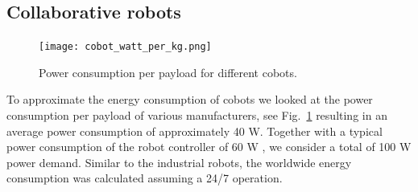 \subsection{Collaborative robots}\label{sec:app_cobot_ener_consumption}
\begin{figure}[!h]
	\centering
	\texttt{[image: cobot\_watt\_per\_kg.png]}
	\caption{Power consumption per payload for different cobots.}
	\label{fig:cobot_watt_per_kg}
\end{figure}
To approximate the energy consumption of cobots we looked at the power consumption per payload of various manufacturers, see Fig.~\ref{fig:cobot_watt_per_kg} resulting in an average power consumption of approximately 40 W. Together with a typical power consumption of the robot controller of 60 W \cite{Heredia2023BreakingEnergyConsumption}, we consider a total of 100 W power demand. Similar to the industrial robots, the worldwide energy consumption was calculated assuming a 24/7 operation.




